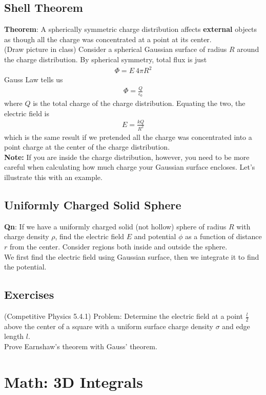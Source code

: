 \documentclass{article}
\begin{document}
\subsection{Shell Theorem}
\textbf{Theorem}: A spherically symmetric charge distribution affects \textbf{external} objects as though all the charge was concentrated at a point at its center.\\[10pt]
(Draw picture in class) Consider a spherical Gaussian surface of radius $R$ around the charge distribution. By spherical symmetry, total flux is just 
\begin{align}
    \Phi = E\ 4\pi R^2
\end{align}
Gauss Law tells us 
\begin{align}
    \Phi = \frac{Q}{\epsilon_0}
\end{align}
where $Q$ is the total charge of the charge distribution. Equating the two, the electric field is 
\begin{align}
    E = \frac{kQ}{R^2}
\end{align}
which is the same result if we pretended all the charge was concentrated into a point charge at the center of the charge distribution. \\[10pt]
\textbf{Note:} If you are inside the charge distribution, however, you need to be more careful when calculating how much charge your Gaussian surface encloses. Let's illustrate this with an example.
\subsection{Uniformly Charged Solid Sphere}
\textbf{Qn}: If we have a uniformly charged solid (not hollow) sphere of radius $R$ with charge density $\rho$, find the electric field $E$ and potential $\phi$ as a function of distance $r$ from the center. Consider regions both inside and outside the sphere. \\[10pt]
We first find the electric field using Gaussian surface, then we integrate it to find the potential. 
\subsection{Exercises}
(Competitive Physics 5.4.1) Problem: Determine the electric field at a point $\frac{l}{2}$ above the center of a square with a uniform surface charge density $\sigma$ and edge length $l$. \\[20pt]
Prove Earnshaw's theorem with Gauss' theorem.
\section{Math: 3D Integrals}
\end{document}
